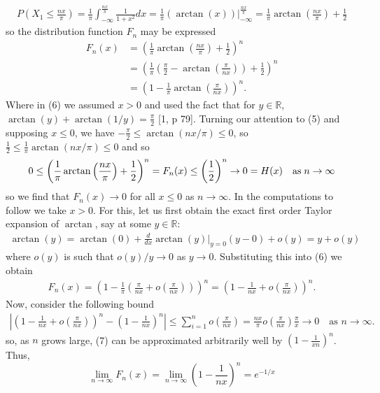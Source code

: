 \documentclass[10pt]{article}
\newcommand{\bp}[1]{\left({#1}\right)}
\newcommand{\mbb}[1]{\mathbb{#1}}
\newcommand{\1}[1]{\mathbbm{1}_{#1}}
\begin{document}
    \begin{align*}
        P\bp{X_1\leq\frac{nx}{\pi}}=\frac{1}{\pi}\int_{-\infty}^{\frac{nx}{\pi}}\frac{1}{1+x^2}dx=\frac{1}{\pi}\bp{\arctan(x)}\bigg|_{-\infty}^{\frac{nx}{\pi}}=\frac{1}{\pi}\arctan\bp{\frac{nx}{\pi}}+\frac{1}{2}
    \end{align*}
    so the distribution function $F_n$ may be expressed
    \begin{align*}
        F_n(x)&=\bp{\frac{1}{\pi}\arctan\bp{\frac{nx}{\pi}}+\frac{1}{2}}^n\tag{5}\\
        &=\bp{\frac{1}{\pi}\bp{\frac{\pi}{2}-\arctan\bp{\frac{\pi}{nx}}}+\frac{1}{2}}^n\tag{6}\\
        &=\bp{1-\frac{1}{\pi}\arctan\bp{\frac{\pi}{nx}}}^n.
    \end{align*}
    Where in (6) we assumed $x>0$ and used the fact that for $y\in\mbb{R}$, $\arctan(y)+\arctan(1/y)=\frac{\pi}{2}$ [1, p 79]. Turning our attention to (5) and supposing $x\leq 0$, we have $-\tfrac{\pi}{2}\leq\arctan(nx/\pi)\leq 0$, so $\tfrac{1}{2}\leq\tfrac{1}{\pi}\arctan(nx/\pi)\leq 0$ and so
    \[0\leq \bp{\frac{1}{\pi}\arctan\bp{\frac{nx}{\pi}}+\frac{1}{2}}^n=F_n(x)\leq\bp{\frac{1}{2}}^n\rightarrow 0=H(x)\quad\text{as\;$n\rightarrow\infty$}\]
    so we find that $F_n(x)\rightarrow0$ for all $x\leq 0$ as $n\rightarrow\infty$. In the computations to follow we take $x>0$. For this, let us first obtain the exact first order Taylor expansion of $\arctan$, say at some $y\in\mbb{R}$:
    \begin{align*}
        \arctan(y)=\arctan(0)+\frac{d}{dx}\arctan(y)\big|_{y=0}(y-0)+o(y)=y+o(y)
    \end{align*}
    where $o(y)$ is such that $o(y)/y\rightarrow 0$ as $y\rightarrow 0$. Substituting this into (6) we obtain
    \begin{align*}
        F_n(x)=\bp{1-\frac{1}{\pi}\bp{\frac{\pi}{nx}+o\bp{\frac{\pi}{nx}}}}^n=\bp{1-\frac{1}{nx}+o\bp{\frac{\pi}{nx}}}^n.\tag{7}
    \end{align*}
    Now, consider the following bound
    \begin{align*}
        \left|\bp{1-\frac{1}{nx}+o\bp{\frac{\pi}{nx}}}^n-\bp{1-\frac{1}{nx}}^n\right|\leq\sum_{i=1}^no\bp{\frac{\pi}{nx}}=\frac{nx}{\pi}o\bp{\frac{\pi}{nx}}\frac{\pi}{x}\rightarrow 0\quad\text{as $n\rightarrow \infty$.}
    \end{align*}
    so, as $n$ grows large, (7) can be approximated arbitrarily well by $(1-\tfrac{1}{xn})^n$. Thus,
    \[\lim_{n\rightarrow\infty}F_n(x)=\lim_{n\rightarrow\infty}\bp{1-\frac{1}{nx}}^n=e^{-1/x}\]
\end{document}
